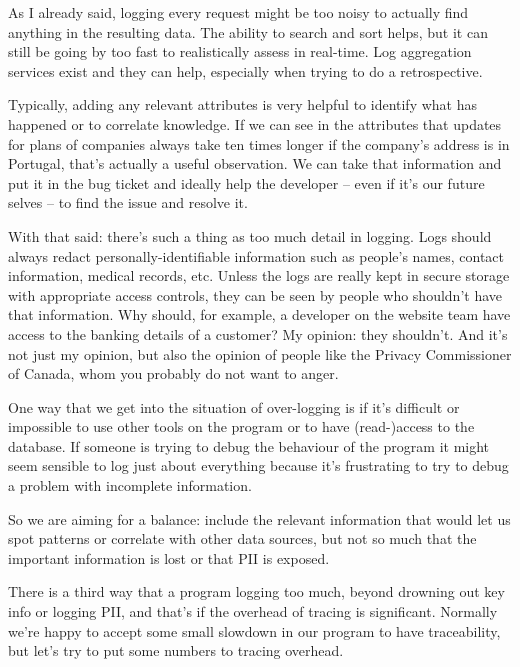 As I already said, logging every request might be too noisy to actually find anything in the resulting data. The ability to search and sort helps, but it can still be going by too fast to realistically assess in real-time. Log aggregation services exist and they can help, especially when trying to do a retrospective.

Typically, adding any relevant attributes is very helpful to identify what has happened or to correlate knowledge. If we can see in the attributes that updates for plans of companies always take ten times longer if the company's address is in Portugal, that's actually a useful observation. We can take that information and put it in the bug ticket and ideally help the developer -- even if it's our future selves -- to find the issue and resolve it.

With that said: there's such a thing as too much detail in logging. Logs should always redact personally-identifiable information such as people's names, contact information, medical records, etc. Unless the logs are really kept in secure storage with appropriate access controls, they can be seen by people who shouldn't have that information. Why should, for example, a developer on the website team have access to the banking details of a customer? My opinion: they shouldn't. And it's not just my opinion, but also the opinion of people like the Privacy Commissioner of Canada, whom you probably do not want to anger.

One way that we get into the situation of over-logging is if it's difficult or impossible to use other tools on the program or to have (read-)access to the database. If someone is trying to debug the behaviour of the program it might seem sensible to log just about everything because it's frustrating to try to debug a problem with incomplete information. 

So we are aiming for a balance: include the relevant information that would let us spot patterns or correlate with other data sources, but not so much that the important information is lost or that PII is exposed.

There is a third way that a program logging too much, beyond drowning out key info or logging PII, and that's if the overhead of tracing is significant. Normally we're happy to accept some small slowdown in our program to have traceability, but let's try to put some numbers to tracing overhead. 

